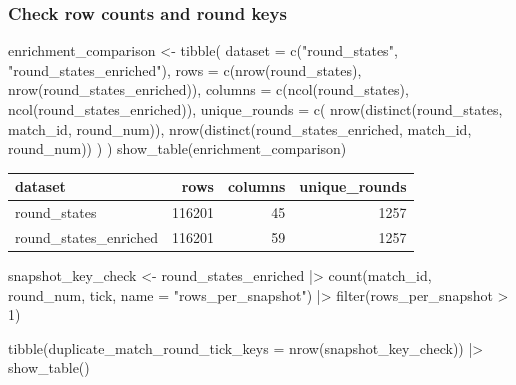 \documentclass[
  letterpaper,
  DIV=11,
  numbers=noendperiod]{scrartcl}
\newenvironment{Shaded}{\begin{snugshade}}{\end{snugshade}}
\newcommand{\AttributeTok}[1]{\textcolor[rgb]{0.40,0.45,0.13}{#1}}
\newcommand{\DecValTok}[1]{\textcolor[rgb]{0.68,0.00,0.00}{#1}}
\newcommand{\FunctionTok}[1]{\textcolor[rgb]{0.28,0.35,0.67}{#1}}
\newcommand{\NormalTok}[1]{\textcolor[rgb]{0.00,0.23,0.31}{#1}}
\newcommand{\OtherTok}[1]{\textcolor[rgb]{0.00,0.23,0.31}{#1}}
\newcommand{\SpecialCharTok}[1]{\textcolor[rgb]{0.37,0.37,0.37}{#1}}
\newcommand{\StringTok}[1]{\textcolor[rgb]{0.13,0.47,0.30}{#1}}
\newcounter{none} %
\begin{document}
\subsubsection{Check row counts and round
keys}\label{check-row-counts-and-round-keys}

\begin{Shaded}
\begin{Highlighting}[]
\NormalTok{enrichment\_comparison }\OtherTok{\textless{}{-}} \FunctionTok{tibble}\NormalTok{(}
  \AttributeTok{dataset =} \FunctionTok{c}\NormalTok{(}\StringTok{"round\_states"}\NormalTok{, }\StringTok{"round\_states\_enriched"}\NormalTok{),}
  \AttributeTok{rows =} \FunctionTok{c}\NormalTok{(}\FunctionTok{nrow}\NormalTok{(round\_states), }\FunctionTok{nrow}\NormalTok{(round\_states\_enriched)),}
  \AttributeTok{columns =} \FunctionTok{c}\NormalTok{(}\FunctionTok{ncol}\NormalTok{(round\_states), }\FunctionTok{ncol}\NormalTok{(round\_states\_enriched)),}
  \AttributeTok{unique\_rounds =} \FunctionTok{c}\NormalTok{(}
    \FunctionTok{nrow}\NormalTok{(}\FunctionTok{distinct}\NormalTok{(round\_states, match\_id, round\_num)),}
    \FunctionTok{nrow}\NormalTok{(}\FunctionTok{distinct}\NormalTok{(round\_states\_enriched, match\_id, round\_num))}
\NormalTok{  )}
\NormalTok{)}
\FunctionTok{show\_table}\NormalTok{(enrichment\_comparison)}
\end{Highlighting}
\end{Shaded}

{\def\LTcaptype{none} %
\begin{longtable}[]{@{}lrrr@{}}
\toprule\noalign{}
dataset & rows & columns & unique\_rounds \\
\midrule\noalign{}
\endhead
\bottomrule\noalign{}
\endlastfoot
round\_states & 116201 & 45 & 1257 \\
round\_states\_enriched & 116201 & 59 & 1257 \\
\end{longtable}
}

\begin{Shaded}
\begin{Highlighting}[]
\NormalTok{snapshot\_key\_check }\OtherTok{\textless{}{-}}\NormalTok{ round\_states\_enriched }\SpecialCharTok{|\textgreater{}}
  \FunctionTok{count}\NormalTok{(match\_id, round\_num, tick, }\AttributeTok{name =} \StringTok{"rows\_per\_snapshot"}\NormalTok{) }\SpecialCharTok{|\textgreater{}}
  \FunctionTok{filter}\NormalTok{(rows\_per\_snapshot }\SpecialCharTok{\textgreater{}} \DecValTok{1}\NormalTok{)}

\FunctionTok{tibble}\NormalTok{(}\AttributeTok{duplicate\_match\_round\_tick\_keys =} \FunctionTok{nrow}\NormalTok{(snapshot\_key\_check)) }\SpecialCharTok{|\textgreater{}}
  \FunctionTok{show\_table}\NormalTok{()}
\end{Highlighting}
\end{Shaded}
\end{document}
